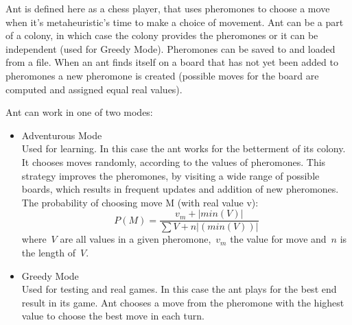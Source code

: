 \documentclass[pdftex]{article}
\begin{document}
Ant is defined here as a chess player, that uses pheromones to choose a move when it's metaheuristic's time to make a choice of movement. Ant can be a part of a colony, in which case the colony provides the pheromones or it can be independent (used for Greedy Mode). Pheromones can be saved to and loaded from a file. When an ant finds itself on a board that has not yet been added to pheromones a new pheromone is created (possible moves for the board are computed and assigned equal real values).

 Ant can work in one of two modes: 
\begin{itemize}
 	\item Adventurous Mode \hfill \\
		Used for learning. In this case the ant works for the betterment of its colony. It chooses moves randomly, according to the values of pheromones. This strategy improves the pheromones, by visiting a wide range of possible boards, which results in frequent updates and addition of new pheromones. The probability of choosing move M (with real value v):
\begin{equation}
\label{eq:choosingequation}
	P(M) = \frac{v_m + |min(V)|}{\sum V + n|(min(V))|}
\end{equation}
where~$V$ are all values in a given pheromone,~$v_m$ the value for move and~$n$ is the length of~$V$.

	\item Greedy Mode \hfill \\
		Used for testing and real games. In this case the ant plays for the best end result in its game. Ant chooses a move from the pheromone with the highest value to choose the best move in each turn.
\end{itemize}
\end{document}
